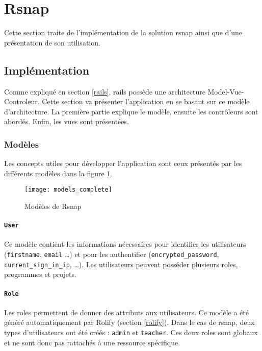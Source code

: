 \section{Rsnap}
\graphicspath{{content/7-solution/3-rsnap/images/}}
Cette section traite de l'implémentation de la solution \gls{rsnap} ainsi que d'une présentation de son utilisation.

\subsection{Implémentation}
Comme expliqué en section \ref{rails}, \gls{rails} possède une architecture Model-Vue-Controleur. Cette section va présenter l'application en se basant sur ce modèle d'architecture. La première partie explique le modèle, ensuite les contrôleurs sont abordés. Enfin, les vues sont présentées.

\subsubsection{Modèles}
Les concepts utiles pour développer l'application sont ceux présentés par les différents modèles dans la figure \ref{fig:models}.

\begin{figure}
 \begin{center}
   \texttt{[image: models\_complete]}
   \caption{Modèles de Rsnap}
   \label{fig:models}
 \end{center}
\end{figure}

\paragraph{\texttt{User}} Ce modèle contient les informations nécessaires pour identifier les utilisateurs (\texttt{firstname}, \texttt{email} \ldots) et pour les authentifier (\texttt{encrypted\_password}, \texttt{current\_sign\_in\_ip}, \ldots). Les utilisateurs peuvent posséder plusieurs \glspl{role}, programmes et projets.

\paragraph{\texttt{Role}} Les \glspl{role} permettent de donner des attributs aux utilisateurs. Ce modèle a été généré automatiquement par Rolify (section \ref{rolify}). Dans le cas de \gls{rsnap}, deux types d'utilisateurs ont été créés : \texttt{admin} et \texttt{teacher}. Ces deux \glspl{role} sont globaux et ne sont donc pas rattachés à une ressource spécifique.

